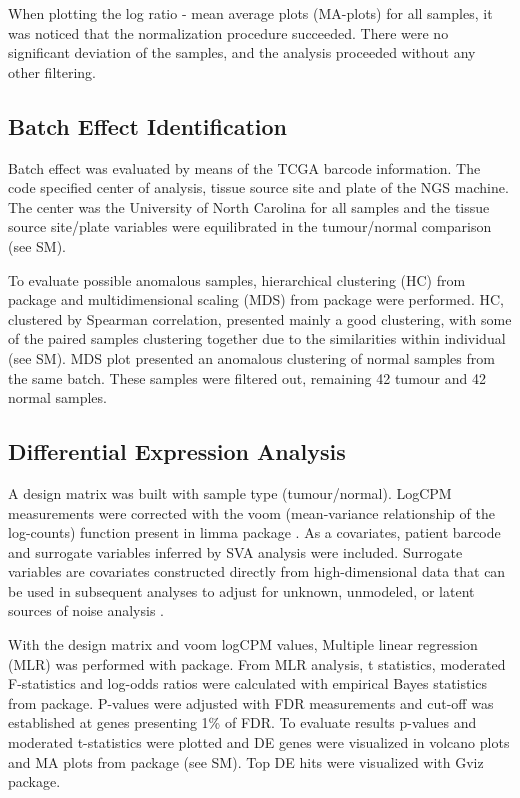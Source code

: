 \documentclass[9pt,twocolumn,twoside]{gsajnl}
\begin{document}
When plotting the log ratio - mean average plots (MA-plots) for all samples, it was noticed that the normalization procedure succeeded. There were no significant deviation of the samples, and the analysis proceeded without any other filtering.

\subsection*{Batch Effect Identification}

Batch effect was evaluated by means of the TCGA barcode information. The code specified center of analysis, tissue source site and plate of the NGS machine. The center was the University of North Carolina for all samples and the tissue source site/plate variables were equilibrated in the tumour/normal comparison (see SM).

To evaluate possible anomalous samples, hierarchical clustering (HC) from \cite{pheatmap} package and multidimensional scaling (MDS) from \cite{limma} package were performed. HC, clustered by Spearman correlation, presented mainly a good clustering, with some of the paired samples clustering together due to the similarities within individual (see SM). MDS plot presented an anomalous clustering of normal samples from the same batch. These samples were filtered out, remaining 42 tumour and 42 normal samples.


\subsection*{Differential Expression Analysis}

A design matrix was built with sample type (tumour/normal). LogCPM measurements were corrected with the  voom (mean-variance relationship of the log-counts) function present in limma package \cite{voom}. As a covariates,  patient barcode and surrogate variables inferred by SVA analysis were included. Surrogate variables are covariates constructed directly from high-dimensional data that can be used in subsequent analyses to adjust for unknown, unmodeled, or latent sources of noise analysis \cite{GSVA}.

With the design matrix and voom logCPM values, Multiple linear regression (MLR) was performed with \cite{limma} package. From MLR analysis, t statistics, moderated F-statistics and  log-odds ratios were calculated with empirical Bayes statistics from \cite{limma} package. P-values were adjusted with FDR measurements and cut-off was established at genes presenting 1\% of FDR. To evaluate results p-values and moderated t-statistics were plotted and DE genes were visualized in volcano plots and  MA plots  from \cite{limma} package (see SM). Top DE hits were visualized with Gviz package.
\end{document}
